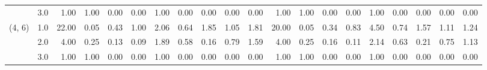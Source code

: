 \begin{tabular}{llrrrrrrrrrrrrrrrrrr}
       & 3.0 &               1.00 &                     1.00 &                                 0.00 &                             0.00 &                           1.00 &                                               0.00 &                                            0.00 &                                            0.00 &                                        0.00 &               1.00 &                     1.00 &                                 0.00 &                             0.00 &                           1.00 &                                               0.00 &                                            0.00 &                                            0.00 &                                        0.00 \\
(4, 6) & 1.0 &              22.00 &                     0.05 &                                 0.43 &                             1.00 &                           2.06 &                                               0.64 &                                            1.85 &                                            1.05 &                                        1.81 &              20.00 &                     0.05 &                                 0.34 &                             0.83 &                           4.50 &                                               0.74 &                                            1.57 &                                            1.11 &                                        1.24 \\
       & 2.0 &               4.00 &                     0.25 &                                 0.13 &                             0.09 &                           1.89 &                                               0.58 &                                            0.16 &                                            0.79 &                                        1.59 &               4.00 &                     0.25 &                                 0.16 &                             0.11 &                           2.14 &                                               0.63 &                                            0.21 &                                            0.75 &                                        1.13 \\
       & 3.0 &               1.00 &                     1.00 &                                 0.00 &                             0.00 &                           1.00 &                                               0.00 &                                            0.00 &                                            0.00 &                                        0.00 &               1.00 &                     1.00 &                                 0.00 &                             0.00 &                           1.00 &                                               0.00 &                                            0.00 &                                            0.00 &                                        0.00 \\

\end{tabular}
